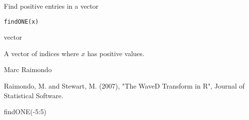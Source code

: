 \begin{Description}\relax
Find positive entries in a vector
\end{Description}
\begin{Usage}
\begin{verbatim}
findONE(x)
\end{verbatim}
\end{Usage}
\begin{Arguments}
\begin{ldescription}
\item[\code{x}] vector
\end{ldescription}
\end{Arguments}
\begin{Value}
A vector of indices where $x$
has positive values.
\end{Value}
\begin{Author}\relax
Marc Raimondo
\end{Author}
\begin{References}\relax
Raimondo, M. and Stewart, M. (2007),
"The WaveD Transform in R", Journal of Statistical Software.
\end{References}
\begin{SeeAlso}\relax
{}
\end{SeeAlso}
\begin{Examples}
\begin{ExampleCode}findONE(-5:5)
\end{ExampleCode}
\end{Examples}

